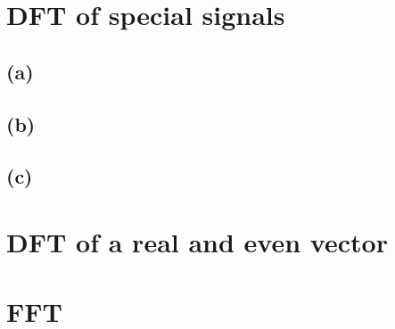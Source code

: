 \documentclass{article}
\begin{document}
\newpage
\section{DFT of special signals}
\subsection*{(a)}

\subsection*{(b)}
\subsection*{(c)}

\newpage
\section{DFT of a real and even vector}

\newpage
\section{FFT}
\end{document}
